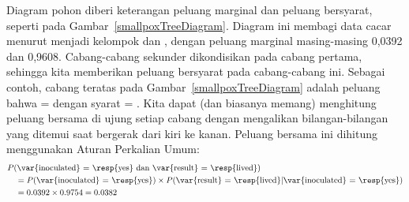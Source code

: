 Diagram pohon diberi keterangan peluang marginal dan peluang bersyarat, seperti pada Gambar~\ref{smallpoxTreeDiagram}. Diagram ini membagi data cacar menurut  menjadi kelompok  dan , dengan peluang marginal masing-masing 0,0392 dan 0,9608. Cabang-cabang sekunder dikondisikan pada cabang pertama, sehingga kita memberikan peluang bersyarat pada cabang-cabang ini. Sebagai contoh, cabang teratas pada Gambar~\ref{smallpoxTreeDiagram} adalah peluang bahwa  =  dengan syarat  = . Kita dapat (dan biasanya memang) menghitung peluang bersama di ujung setiap cabang dengan mengalikan bilangan-bilangan yang ditemui saat bergerak dari kiri ke kanan. Peluang bersama ini dihitung menggunakan Aturan Perkalian Umum:
\begin{align*}
& P(\text{\var{inoculated} = \resp{yes}
    dan \var{result} = \resp{lived}}) \\
  &\quad = P(\text{\var{inoculated} = \resp{yes}})\times
      P(\text{\var{result} = \resp{lived}}|
          \text{\var{inoculated} = \resp{yes}}) \\
  &\quad = 0.0392\times 0.9754=0.0382
\end{align*}

